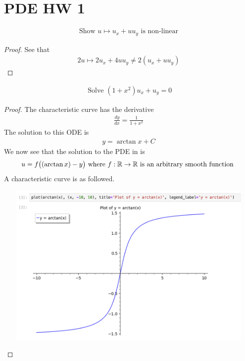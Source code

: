\documentclass{report}
\begin{document}
\section{PDE HW 1}
\begin{theorem}
\begin{align*}
\text{ Show }u\mapsto u_x+uu_y\text{ is non-linear }
\end{align*}
\end{theorem}
\begin{proof}
See that 
\begin{align}
\label{he1}
2u\mapsto 2u_x+4uu_y\neq 2(u_x+uu_y)
\end{align}
\end{proof}
\begin{theorem}
\begin{align*}
\text{ Solve }(1+x^2)u_x+u_y=0
\end{align*}
\end{theorem}
\begin{proof}
The characteristic curve has the derivative 
\begin{align*}
\frac{dy}{dx}=\frac{1}{1+x^2}
\end{align*}
The solution to this ODE is 
\begin{align*}
y=\arctan x + C
\end{align*}
We now see that the solution to the PDE in  is 
\begin{align*}
u=f\big((\arctan x)-y\big)\text{ where }f:\mathbb{R}\rightarrow \mathbb{R}\text{ is an arbitrary smooth function }
\end{align*}
A characteristic curve is as followed.
\begin{center}
   \begin{minipage}{0.9\linewidth}  
       \centering       
\includegraphics[height=8cm,width=15cm]{pdehw1}
   \end{minipage}
\end{center}
\end{proof}
\end{document}
